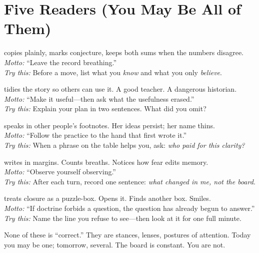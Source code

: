\documentclass[11pt]{article}
\begin{document}
\section*{Five Readers (You May Be All of Them)}
\begin{description}[leftmargin=!,labelwidth=2.8cm,style=nextline]
  \item[\textbf{The Archivist}] copies plainly, marks conjecture, keeps both sums when the numbers disagree.\\
  \textit{Motto:} ``Leave the record breathing.''\\
  \textit{Try this:} Before a move, list what you \emph{know} and what you only \emph{believe}.

  \item[\textbf{The Canonizer}] tidies the story so others can use it. A good teacher. A dangerous historian.\\
  \textit{Motto:} ``Make it useful---then ask what the usefulness erased.''\\
  \textit{Try this:} Explain your plan in two sentences. What did you omit?

  \item[\textbf{The Silenced Source}] speaks in other people's footnotes. Her ideas persist; her name thins.\\
  \textit{Motto:} ``Follow the practice to the hand that first wrote it.''\\
  \textit{Try this:} When a phrase on the table helps you, ask: \emph{who paid for this clarity?}

  \item[\textbf{The Commentator}] writes in margins. Counts breaths. Notices how fear edits memory.\\
  \textit{Motto:} ``Observe yourself observing.''\\
  \textit{Try this:} After each turn, record one sentence: \emph{what changed in me, not the board}.

  \item[\textbf{The Heretic}] treats closure as a puzzle-box. Opens it. Finds another box. Smiles.\\
  \textit{Motto:} ``If doctrine forbids a question, the question has already begun to answer.''\\
  \textit{Try this:} Name the line you refuse to see---then look at it for one full minute.
\end{description}

None of these is ``correct.'' They are stances, lenses, postures of attention. Today you may be one; tomorrow, several. The board is constant. You are not.
\end{document}
